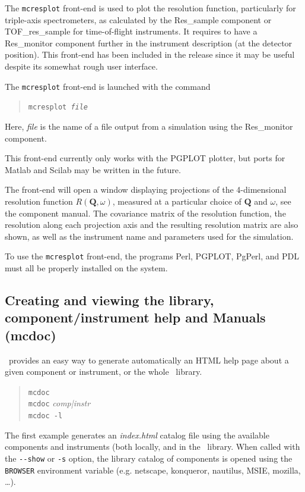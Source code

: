 The \verb+mcresplot+ front-end is used to plot the resolution function, particularly for triple-axis
spectrometers, as
calculated by the Res\_sample component or TOF\_res\_sample for
time-of-flight instruments. It requires to have a Res\_monitor component further in the instrument description (at the detector position).
This front-end
has been included in the release since it may be useful
despite its somewhat rough user interface.

The \verb+mcresplot+ front-end is launched with the command
\begin{quote}
  \texttt{mcresplot {\it file\/}}
\end{quote}
Here, {\it file\/} is the name of a file output from a simulation using
the Res\_monitor component.

This front-end currently only works with the PGPLOT plotter, but ports for Matlab and Scilab may be written in the future.

The front-end will open a window displaying projections of the 4-dimensional
resolution function $R(\boldsymbol{Q}, \omega)$, measured at a
particular choice of $\boldsymbol{Q}$ and $\omega$, see the component
manual. The covariance matrix of the
resolution function, the resolution along each projection axis and the resulting
resolution matrix are also shown, as well as the instrument name and parameters
used for the simulation.

To use the \verb+mcresplot+ front-end, the programs Perl, PGPLOT, PgPerl,
and PDL must all be properly installed on the system.

\subsection{Creating and viewing the library, component/instrument help and Manuals (mcdoc)}
\label{s:mcdoc-run}

\MCS\ provides an easy way to generate automatically an HTML help page about a given component or instrument, or the whole \MCS\ library. 
\begin{quote}
  \verb|mcdoc|\\
  \verb|mcdoc| {\it comp|instr}\\
  \verb|mcdoc -l|
\end{quote}
The first example generates an {\it index.html} catalog file using the available components and instruments (both locally, and in the \MCS\ library. When called with the \verb+--show+ or \verb+-s+ option, the library catalog of components is opened using the \verb+BROWSER+ environment variable  (e.g. netscape, konqueror, nautilus, MSIE, mozilla, \ldots).

